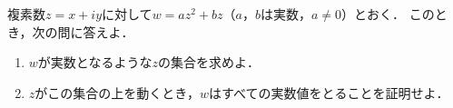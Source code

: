 \documentclass[../../main.tex]{subfiles}
\begin{document}
複素数$z=x+iy$に対して$w=az^2+bz$（$a$，$b$は実数，$a\neq0$）とおく．
このとき，次の問に答えよ．
\begin{enumerate}
  \item $w$が実数となるような$z$の集合を求めよ．
  \item $z$がこの集合の上を動くとき，$w$はすべての実数値をとることを証明せよ．
\end{enumerate}
\end{document}
